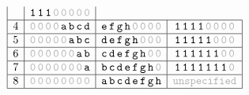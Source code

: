 \begin{figure}[!h]
\[\begin{array}{|c|c|c|c|}
        & \texttt{1\,1\,1\,\gray{0\,0\,0\,0\,0}} \\
        \hline
        4
        & \texttt{\gray{0\,0\,0\,0}\,a\,b\,c\,d}
        & \texttt{e\,f\,g\,h\,\gray{0\,0\,0\,0}}
        & \texttt{1\,1\,1\,1\,\gray{0\,0\,0\,0}} \\
        \hline
        5 &\texttt{\gray{0\,0\,0\,0\,0}\,a\,b\,c}
        & \texttt{d\,e\,f\,g\,h\,\gray{0\,0\,0}}
        & \texttt{1\,1\,1\,1\,1\,\gray{0\,0\,0}} \\
        \hline
        6
        & \texttt{\gray{0\,0\,0\,0\,0\,0}\,a\,b}
        & \texttt{c\,d\,e\,f\,g\,h\,\gray{0\,0}}
        & \texttt{1\,1\,1\,1\,1\,1\,\gray{0\,0}} \\
        \hline
        7
        & \texttt{\gray{0\,0\,0\,0\,0\,0\,0}\,a}
        & \texttt{b\,c\,d\,e\,f\,g\,h\,\gray{0}}
        & \texttt{1\,1\,1\,1\,1\,1\,1\,\gray{0}}\\
        \hline
        8 &\texttt{\gray{0\,0\,0\,0\,0\,0\,0\,0}}
        & \texttt{a\,b\,c\,d\,e\,f\,g\,h}
        & \texttt{\gray{unspecified}} \\
        \hline
    \end{array}
\]
\label{fig: split and shift bytes and ones}
\end{figure}